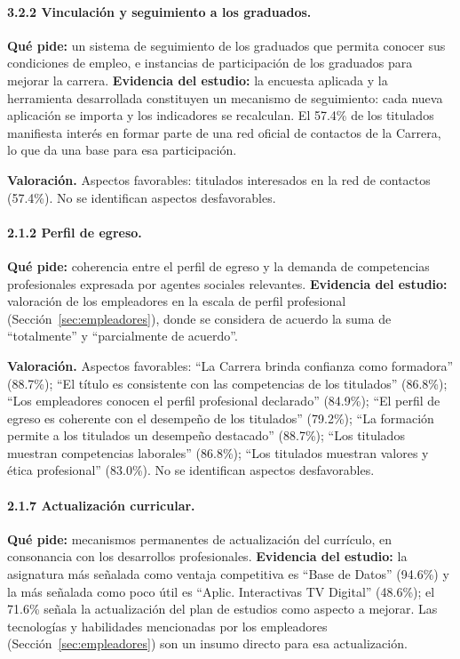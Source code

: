 \paragraph{3.2.2 Vinculación y seguimiento a los graduados.} \textbf{Qué pide:} un sistema de seguimiento de los graduados que permita conocer sus condiciones de empleo, e instancias de participación de los graduados para mejorar la carrera. \textbf{Evidencia del estudio:} la encuesta aplicada y la herramienta desarrollada constituyen un mecanismo de seguimiento: cada nueva aplicación se importa y los indicadores se recalculan. El 57.4\% de los titulados manifiesta interés en formar parte de una red oficial de contactos de la Carrera, lo que da una base para esa participación.

\textbf{Valoración.} Aspectos favorables: titulados interesados en la red de contactos (57.4\%). No se identifican aspectos desfavorables.

\paragraph{2.1.2 Perfil de egreso.} \textbf{Qué pide:} coherencia entre el perfil de egreso y la demanda de competencias profesionales expresada por agentes sociales relevantes. \textbf{Evidencia del estudio:} valoración de los empleadores en la escala de perfil profesional (Sección~\ref{sec:empleadores}), donde se considera de acuerdo la suma de ``totalmente'' y ``parcialmente de acuerdo''.

\textbf{Valoración.} Aspectos favorables: ``La Carrera brinda confianza como formadora'' (88.7\%); ``El título es consistente con las competencias de los titulados'' (86.8\%); ``Los empleadores conocen el perfil profesional declarado'' (84.9\%); ``El perfil de egreso es coherente con el desempeño de los titulados'' (79.2\%); ``La formación permite a los titulados un desempeño destacado'' (88.7\%); ``Los titulados muestran competencias laborales'' (86.8\%); ``Los titulados muestran valores y ética profesional'' (83.0\%). No se identifican aspectos desfavorables.

\paragraph{2.1.7 Actualización curricular.} \textbf{Qué pide:} mecanismos permanentes de actualización del currículo, en consonancia con los desarrollos profesionales. \textbf{Evidencia del estudio:} la asignatura más señalada como ventaja competitiva es ``Base de Datos'' (94.6\%) y la más señalada como poco útil es ``Aplic. Interactivas TV Digital'' (48.6\%); el 71.6\% señala la actualización del plan de estudios como aspecto a mejorar. Las tecnologías y habilidades mencionadas por los empleadores (Sección~\ref{sec:empleadores}) son un insumo directo para esa actualización.

